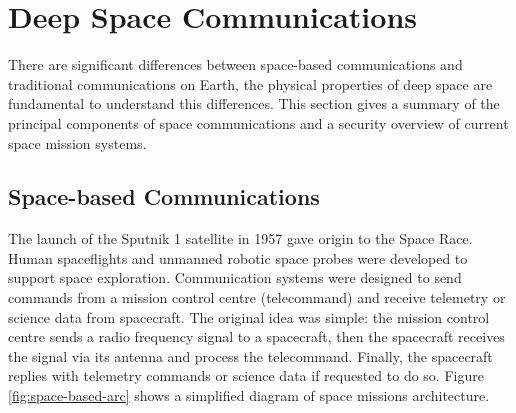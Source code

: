 \section{Deep Space Communications}
\label{sec:space}

There are significant differences between space-based communications and traditional communications on Earth, the physical properties of deep space are fundamental to understand this differences. This section gives a summary of the principal components of space communications and a security overview of current space mission systems. 



\subsection{Space-based Communications}

The launch of the Sputnik 1 satellite in 1957 gave origin to the Space Race. Human spaceflights and unmanned robotic space probes were developed to support space exploration. Communication systems were designed to send commands from a mission control centre (telecommand) and receive telemetry or science data from spacecraft. The original idea was simple: the mission control centre sends a radio frequency signal to a spacecraft, then the spacecraft receives the signal via its antenna and process the telecommand. Finally, the spacecraft replies with telemetry commands or science data if requested to do so. Figure \ref{fig:space-based-arc} shows a simplified diagram of space missions architecture.  



